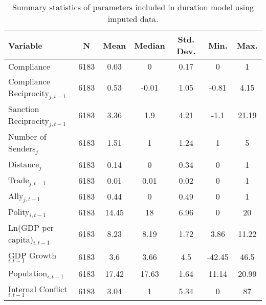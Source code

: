 \begin{table}[ht]
\centering
{\normalsize
\begin{tabular}{lcccccc}
 Variable & N & Mean & Median & Std. Dev. & Min. & Max. \\ 
  \hline
\hline
Compliance & 6183 & 0.03 & 0 & 0.17 & 0 & 1 \\ 
  Compliance Reciprocity$_{j,t-1}$ & 6183 & 0.53 & -0.01 & 1.05 & -0.81 & 4.15 \\ 
  Sanction Reciprocity$_{j,t-1}$ & 6183 & 3.36 & 1.9 & 4.21 & -1.1 & 21.19 \\ 
  Number of Senders$_{j}$ & 6183 & 1.51 & 1 & 1.24 & 1 & 5 \\ 
  Distance$_{j}$ & 6183 & 0.14 & 0 & 0.34 & 0 & 1 \\ 
  Trade$_{j,t-1}$ & 6183 & 0.01 & 0.01 & 0.02 & 0 & 1 \\ 
  Ally$_{j,t-1}$ & 6183 & 0.44 & 0 & 0.49 & 0 & 1 \\ 
  Polity$_{i,t-1}$ & 6183 & 14.45 & 18 & 6.96 & 0 & 20 \\ 
  Ln(GDP per capita)$_{i,t-1}$ & 6183 & 8.23 & 8.19 & 1.72 & 3.86 & 11.22 \\ 
  GDP Growth$_{i,t-1}$ & 6183 & 3.6 & 3.66 & 4.5 & -42.45 & 46.5 \\ 
  Population$_{i,t-1}$ & 6183 & 17.42 & 17.63 & 1.64 & 11.14 & 20.99 \\ 
  Internal Conflict$_{i,t-1}$ & 6183 & 3.04 & 1 & 5.34 & 0 & 87 \\ 
   \hline
\hline
\end{tabular}
}
\caption{Summary statistics of parameters included in duration model using imputed data.} 
\label{tab:summImp}
\end{table}
